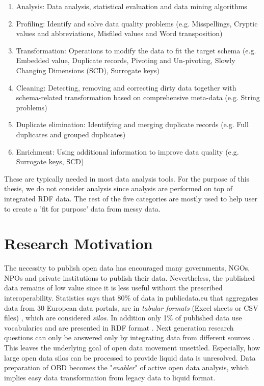 \begin{enumerate}
\item Analysis: Data analysis, statistical evaluation and data mining algorithms
\item Profiling: Identify and solve data quality problems (e.g. Misspellings, Cryptic values and abbreviations, Misfiled values and Word transposition) \cite{datacleaningprobsandapproaches}
\item Transformation: Operations to modify the data to fit the target schema (e.g. Embedded value,  Duplicate records, Pivoting and Un-pivoting, Slowly Changing Dimensions (SCD), Surrogate keys) \cite{datacleaningprobsandapproaches}\cite{ETL}
\item Cleaning: Detecting, removing and correcting dirty data together with schema-related transformation based on comprehensive meta-data (e.g. String problems) \cite{datacleaningprobsandapproaches}
\item Duplicate elimination: Identifying and merging duplicate records (e.g. Full duplicates and grouped duplicates)
\item Enrichment: Using additional information to improve data quality (e.g. Surrogate keys, SCD) \cite{ETL}
\end{enumerate}
\noindent These are typically needed in most data analysis tools. For the purpose of this thesis, we do not consider analysis since analysis are performed on top of integrated RDF data. The rest of the five categories are mostly used to help user to create a 'fit for purpose' data from messy data. 

\section{Research Motivation}
\label{sec:motivation}
 \noindent The necessity to publish open data has encouraged many governments, NGOs, NPOs and private institutions to publish their data. Nevertheless, the published data remains of low value since it is less useful without the prescribed interoperability. Statistics says that 80\% of data in publicdata.eu that aggregates data from 30 European data portals, are in\textit{ tabular formats} (Excel sheets or CSV files) \cite{nemreport}, which are considered \textit{silos}. In addition only 1\% of published data use vocabularies and are presented in RDF format \cite{nemreport}. Next generation research questions can only be answered only by integrating data from different sources \cite{nemreport}. This leaves the underlying goal of open data movement unsettled. Especially, how large open data silos can be processed to provide liquid data is unresolved. Data preparation of OBD becomes the "\textit{enabler}" of active open data analysis, which implies easy data transformation from legacy data to liquid format. 

